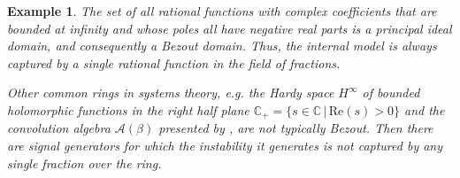 \documentclass[11pt, a4paper]{amsart}
\newtheorem{exa}{Example}
\newcommand{\C}{\mathbb{C}}						%
\newcommand{\Hinfty}{H^\infty}								%
\begin{document}
\begin{exa}\label{exa:example1}
The set of all rational functions with complex coefficients that are bounded at infinity and whose poles all have negative real parts is a principal ideal domain, and consequently a Bezout domain. Thus, the internal model is always captured by a single rational function in the field of fractions.

Other common rings in systems theory, e.g. the Hardy space $\Hinfty$ of bounded holomorphic functions in the right half plane $\C_+=\{s\in\C\, |\, \mathrm{Re}(s)>0 \}$ and the convolution algebra $\mathcal{A}(\beta)$ presented by \cite{CallierDesoer1978}, are not typically Bezout. Then there are signal generators for which the instability it generates is not captured by any single fraction over the ring.
\end{exa}
\end{document}
